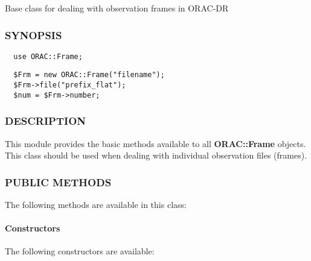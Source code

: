 Base class for dealing with observation frames in ORAC-DR

\subsubsection*{SYNOPSIS\label{ORAC::Frame_SYNOPSIS}}
\begin{verbatim}
  use ORAC::Frame;
\end{verbatim}
\begin{verbatim}
  $Frm = new ORAC::Frame("filename");
  $Frm->file("prefix_flat");
  $num = $Frm->number;
\end{verbatim}
\subsubsection*{DESCRIPTION\label{ORAC::Frame_DESCRIPTION}}


This module provides the basic methods available to all \textbf{ORAC::Frame}
objects. This class should be used when dealing with individual
observation files (frames).

\subsubsection*{PUBLIC METHODS\label{ORAC::Frame_PUBLIC_METHODS}}


The following methods are available in this class:

\paragraph*{Constructors\label{ORAC::Frame_Constructors}}


The following constructors are available:

